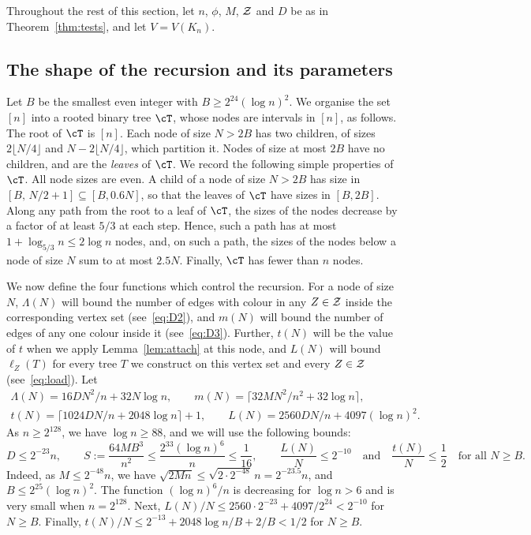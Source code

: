 Throughout the rest of this section, let $n$, $\phi$, $M$, $\mathcal{Z}$ and $D$ be as in Theorem~\ref{thm:tests}, and let $V=V(K_n)$.

\subsection{The shape of the recursion and its parameters}\label{sec:hierarchy}
Let $B$ be the smallest even integer with $B\ge2^{24}(\log n)^2$.
We organise the set $[n]$ into a rooted binary tree $\cT$, whose nodes are intervals in $[n]$, as follows. The root of $\cT$ is $[n]$. Each node of size $N>2B$ has two children, of sizes $2\lfloor N/4\rfloor$ and $N-2\lfloor N/4\rfloor$, which partition it. Nodes of size at most $2B$ have no children, and are the \emph{leaves} of $\cT$.
We record the following simple properties of $\cT$.
All node sizes are even.
A child of a node of size $N>2B$ has size in $[B,\,N/2+1]\subseteq[B,0.6N]$, so that the leaves of $\cT$ have sizes in $[B,2B]$.
Along any path from the root to a leaf of $\cT$, the sizes of the nodes decrease by a factor of at least $5/3$ at each step. Hence, such a path has at most $1+\log_{5/3}n\le2\log n$ nodes, and, on such a path, the sizes of the nodes below a node of size $N$ sum to at most $2.5N$. Finally, $\cT$ has fewer than $n$ nodes.

We now define the four functions which control the recursion. For a node of size $N$, $\Lambda(N)$ will bound the number of edges with colour in any $Z\in \mathcal{Z}$ inside the corresponding vertex set (see~\eqref{eq:D2}), and $m(N)$ will bound the number of edges of any one colour inside it (see~\eqref{eq:D3}). Further, $t(N)$ will be the value of $t$ when we apply Lemma~\ref{lem:attach} at this node, and $L(N)$ will bound $\ell_Z(T)$ for every tree $T$ we construct on this vertex set and every $Z\in\mathcal{Z}$ (see~\eqref{eq:load}). Let
\begin{gather*}
\Lambda(N)=16DN^2/n+32N\log n,\qquad m(N)=\lceil32MN^2/n^2+32\log n\rceil,\\
t(N)=\lceil1024DN/n+2048\log n\rceil+1,\qquad L(N)=2560DN/n+4097(\log n)^2.
\end{gather*}
As $n\ge2^{128}$, we have $\log n\ge 88$, and we will use the following bounds:
\begin{equation}\label{eq:consts}
D\le2^{-23}n,\qquad S:=\frac{64MB^3}{n^2}\le\frac{2^{33}(\log n)^6}{n}\le\frac1{16},\qquad
\frac{L(N)}{N}\le2^{-10}\quad\text{and}\quad \frac{t(N)}{N}\le\frac12\quad\text{for all }N\ge B.
\end{equation}
Indeed, as $M\le 2^{-48}n$, we have $\sqrt{2M n}\le \sqrt{2\cdot2^{-48}}\,n=2^{-23.5}n$, and $B\le2^{25}(\log n)^2$. The function $(\log n)^6/n$ is decreasing for $\log n>6$ and is very small when $n= 2^{128}$. Next, $L(N)/N\le2560\cdot2^{-23}+4097/2^{24}<2^{-10}$ for $N\geq B$. Finally, $t(N)/N\le2^{-13}+2048\log n/B+2/B<1/2$ for $N\geq B$.

